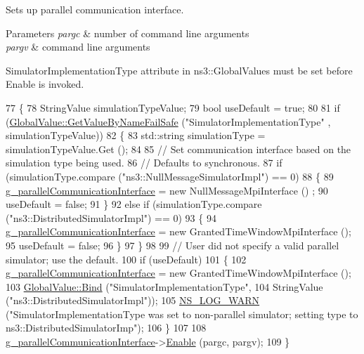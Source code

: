Sets up parallel communication interface. 


\begin{DoxyParams}{Parameters}
{\em pargc} & number of command line arguments \\
\hline
{\em pargv} & command line arguments\\
\hline
\end{DoxyParams}
Simulator\+Implementation\+Type attribute in ns3\+::\+Global\+Values must be set before Enable is invoked. 
\begin{DoxyCode}
77 \{
78   StringValue simulationTypeValue;
79   \textcolor{keywordtype}{bool} useDefault = \textcolor{keyword}{true};
80 
81   \textcolor{keywordflow}{if} (\hyperlink{classns3_1_1GlobalValue_a5ca71172f85db4c2f8c4357e637bb758}{GlobalValue::GetValueByNameFailSafe} (\textcolor{stringliteral}{"SimulatorImplementationType"}
      , simulationTypeValue))
82     \{
83       std::string simulationType = simulationTypeValue.Get ();
84 
85       \textcolor{comment}{// Set communication interface based on the simulation type being used.}
86       \textcolor{comment}{// Defaults to synchronous.}
87       \textcolor{keywordflow}{if} (simulationType.compare (\textcolor{stringliteral}{"ns3::NullMessageSimulatorImpl"}) == 0)
88         \{
89           \hyperlink{classns3_1_1MpiInterface_a271d0de418ec6c13f332ae26995c072f}{g\_parallelCommunicationInterface} = \textcolor{keyword}{new} NullMessageMpiInterface ()
      ;
90           useDefault = \textcolor{keyword}{false};
91         \}
92       \textcolor{keywordflow}{else} \textcolor{keywordflow}{if} (simulationType.compare (\textcolor{stringliteral}{"ns3::DistributedSimulatorImpl"}) == 0)
93         \{
94           \hyperlink{classns3_1_1MpiInterface_a271d0de418ec6c13f332ae26995c072f}{g\_parallelCommunicationInterface} = \textcolor{keyword}{new} 
      GrantedTimeWindowMpiInterface ();
95           useDefault = \textcolor{keyword}{false};
96         \}
97     \}
98 
99   \textcolor{comment}{// User did not specify a valid parallel simulator; use the default.}
100   \textcolor{keywordflow}{if} (useDefault)
101     \{
102       \hyperlink{classns3_1_1MpiInterface_a271d0de418ec6c13f332ae26995c072f}{g\_parallelCommunicationInterface} = \textcolor{keyword}{new} GrantedTimeWindowMpiInterface 
      ();
103       \hyperlink{classns3_1_1GlobalValue_a4fe56773b98d1047cd50e974256fd14a}{GlobalValue::Bind} (\textcolor{stringliteral}{"SimulatorImplementationType"},
104                          StringValue (\textcolor{stringliteral}{"ns3::DistributedSimulatorImpl"}));
105       \hyperlink{group__logging_gade7208b4009cdf0e25783cd26766f559}{NS\_LOG\_WARN} (\textcolor{stringliteral}{"SimulatorImplementationType was set to non-parallel simulator; setting type
       to ns3::DistributedSimulatorImp"});
106     \}
107 
108   \hyperlink{classns3_1_1MpiInterface_a271d0de418ec6c13f332ae26995c072f}{g\_parallelCommunicationInterface}->\hyperlink{classns3_1_1ParallelCommunicationInterface_a0f73feee4076f27f3d80166656bdfdae}{Enable} (pargc, pargv);
109 \}
\end{DoxyCode}


